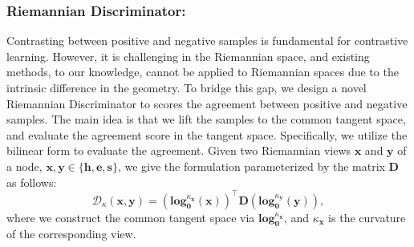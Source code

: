 \subsubsection{Riemannian Discriminator:}
Contrasting between positive and negative samples is fundamental for contrastive learning.
However, it is challenging in the Riemannian space, and existing methods, to our knowledge,  cannot be applied to Riemannian spaces due to the intrinsic difference in the geometry.
To bridge this gap, we design a novel Riemannian Discriminator to scores the agreement between positive and negative samples.
The main idea is that we lift the samples to the common tangent space, 
and evaluate the agreement score in the tangent space.
Specifically, we utilize the bilinear form to evaluate the agreement.
Given two Riemannian views $\mathbf x$ and $\mathbf y$ of a node, $\mathbf x, \mathbf y \in \{\mathbf h, \mathbf e, \mathbf s\}$, we give the formulation parameterized by the matrix $\mathbf D$ as follows:
\begin{equation}
\mathcal D_\kappa(\mathbf x, \mathbf y)=\left(\mathbf{log}_{\mathbf 0}^{\kappa_{\mathbf x}}(\mathbf x)\right)^\top\mathbf D \left(\mathbf{log}_{\mathbf 0}^{\kappa_{\mathbf y}}(\mathbf y)\right),
\end{equation}
where we construct the common tangent space via $\mathbf{log}_{\mathbf 0}^{\kappa_{\mathbf x}}$,
and $\kappa_{\mathbf x}$ is the curvature of the corresponding view. 



